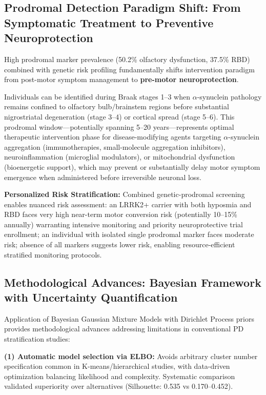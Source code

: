 \documentclass[11pt]{article}
\begin{document}
\subsection*{Prodromal Detection Paradigm Shift: From Symptomatic Treatment to Preventive Neuroprotection}

High prodromal marker prevalence (50.2\% olfactory dysfunction, 37.5\% RBD) combined with genetic risk profiling fundamentally shifts intervention paradigm from post-motor symptom management to \textbf{pre-motor neuroprotection}\cite{mahlknecht2022prodromal,chahine2024biomarker}.

Individuals can be identified during Braak stages 1--3\cite{braak2003staging} when $\alpha$-synuclein pathology remains confined to olfactory bulb/brainstem regions before substantial nigrostriatal degeneration (stage 3--4) or cortical spread (stage 5--6). This prodromal window—potentially spanning 5--20 years—represents optimal therapeutic intervention phase for disease-modifying agents targeting $\alpha$-synuclein aggregation (immunotherapies, small-molecule aggregation inhibitors), neuroinflammation (microglial modulators), or mitochondrial dysfunction (bioenergetic support), which may prevent or substantially delay motor symptom emergence when administered before irreversible neuronal loss.

\textbf{Personalized Risk Stratification:} Combined genetic-prodromal screening enables nuanced risk assessment: an LRRK2+ carrier with both hyposmia and RBD faces very high near-term motor conversion risk (potentially 10--15\% annually) warranting intensive monitoring and priority neuroprotective trial enrollment; an individual with isolated single prodromal marker faces moderate risk; absence of all markers suggests lower risk, enabling resource-efficient stratified monitoring protocols\cite{heinzel2019update,mahlknecht2022prodromal}.

\subsection*{Methodological Advances: Bayesian Framework with Uncertainty Quantification}

Application of Bayesian Gaussian Mixture Models with Dirichlet Process priors provides methodological advances addressing limitations in conventional PD stratification studies\cite{zhang2023machine}:

\textbf{(1) Automatic model selection via ELBO:} Avoids arbitrary cluster number specification common in K-means/hierarchical studies, with data-driven optimization balancing likelihood and complexity. Systematic comparison validated superiority over alternatives (Silhouette: 0.535 vs 0.170--0.452).
\end{document}

